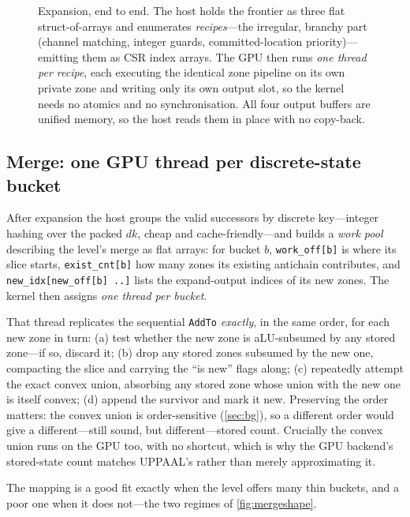 \documentclass[11pt]{article}
\newcommand{\dk}{\ensuremath{\mathit{dk}}}
\newcommand{\code}[1]{\texttt{\small #1}}
\begin{document}
\begin{figure}[t]
\begin{tikzpicture}[font=\small]
\end{tikzpicture}
\caption{Expansion, end to end. The host holds the frontier as three flat struct-of-arrays and enumerates \emph{recipes}---the irregular, branchy part (channel matching, integer guards, committed-location priority)---emitting them as CSR index arrays. The GPU then runs \emph{one thread per recipe}, each executing the identical zone pipeline on its own private zone and writing only its own output slot, so the kernel needs no atomics and no synchronisation. All four output buffers are unified memory, so the host reads them in place with no copy-back.}
\label{fig:threadmap}
\end{figure}

\subsection{Merge: one GPU thread per discrete-state bucket}\label{sec:kmrg}
After expansion the host groups the valid successors by discrete key---integer hashing over the packed
$\dk$, cheap and cache-friendly---and builds a \emph{work pool} describing the level's merge as flat
arrays: for bucket $b$, \code{work\_off[b]} is where its slice starts, \code{exist\_cnt[b]} how many
zones its existing antichain contributes, and \code{new\_idx[new\_off[b]\,..]} lists the expand-output
indices of its new zones. The kernel then assigns \emph{one thread per bucket}.

That thread replicates the sequential \code{AddTo} \emph{exactly}, in the same order, for each new zone
in turn: (a) test whether the new zone is aLU-subsumed by any stored zone---if so, discard it; (b) drop
any stored zones subsumed by the new one, compacting the slice and carrying the ``is new'' flags along;
(c) repeatedly attempt the exact convex union, absorbing any stored zone whose union with the new one
is itself convex; (d) append the survivor and mark it new. Preserving the order matters: the convex
union is order-sensitive (\cref{sec:bg}), so a different order would give a different---still sound,
but different---stored count. Crucially the convex union runs on the GPU too, with no shortcut, which
is why the GPU backend's stored-state count matches UPPAAL's rather than merely approximating it.

The mapping is a good fit exactly when the level offers many thin buckets, and a poor one when it does
not---the two regimes of \cref{fig:mergeshape}.
\end{document}
